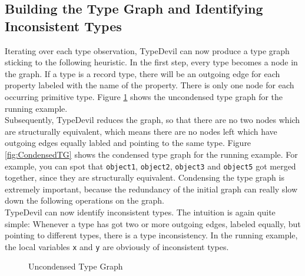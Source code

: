 \documentclass[runningheads,a4paper]{llncs}
\begin{document}
\subsection{Building the Type Graph and Identifying Inconsistent Types}
\label{TGs}

Iterating over each type observation, TypeDevil can now produce a type graph sticking to the following heuristic.
In the first step, every type becomes a node in the graph.
If a type is a record type, there will be an outgoing edge for each property labeled with the name of the property.
There is only one node for each occurring primitive type.
Figure \ref{fig:UncondensedTG} shows the uncondensed type graph for the running example.\\
Subsequently, TypeDevil reduces the graph, so that there are no two nodes which are structurally equivalent, which means there are no nodes left which have outgoing edges equally labled and pointing to the same type.
Figure \ref{fig:CondensedTG} shows the condensed type graph for the running example.
For example, you can spot that \lstinline[columns=fixed]{object1}, \lstinline[columns=fixed]{object2}, \lstinline[columns=fixed]{object3} and \lstinline[columns=fixed]{object5} got merged together, since they are structurally equivalent.
Condensing the type graph is extremely important, because the redundancy of the initial graph can really slow down the following operations on the graph. \\
TypeDevil can now identify inconsistent types. 
The intuition is again quite simple: 
Whenever a type has got two or more outgoing edges, labeled equally, but pointing to different types, there is a type inconsistency.
In the running example, the local variables \lstinline[columns=fixed]{x} and \lstinline[columns=fixed]{y} are obviously of inconsistent types.

\begin{figure}[h]
\caption{Uncondensed Type Graph}
\label{fig:UncondensedTG}
\end{figure}
\end{document}
